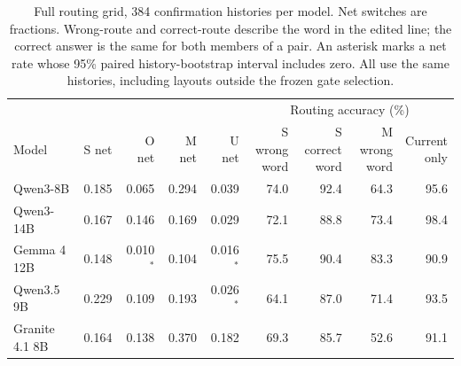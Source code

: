 \begin{table}[t]
\centering
\begin{tabular}{@{}lrrrrrrrr@{}}
\toprule
 & & & & & \multicolumn{4}{c}{Routing accuracy (\%)} \\
\cmidrule(l){6-9}
Model & S net & O net & M net & U net & \shortstack{S wrong\\word} & \shortstack{S correct\\word} & \shortstack{M wrong\\word} & \shortstack{Current\\only} \\
\midrule
Qwen3-8B & 0.185 & 0.065 & 0.294 & 0.039 & 74.0 & 92.4 & 64.3 & 95.6 \\
Qwen3-14B & 0.167 & 0.146 & 0.169 & 0.029 & 72.1 & 88.8 & 73.4 & 98.4 \\
Gemma 4 12B & 0.148 & 0.010$^{*}$ & 0.104 & 0.016$^{*}$ & 75.5 & 90.4 & 83.3 & 90.9 \\
Qwen3.5 9B & 0.229 & 0.109 & 0.193 & 0.026$^{*}$ & 64.1 & 87.0 & 71.4 & 93.5 \\
Granite 4.1 8B & 0.164 & 0.138 & 0.370 & 0.182 & 69.3 & 85.7 & 52.6 & 91.1 \\
\bottomrule
\end{tabular}
\caption{Full routing grid, 384 confirmation histories per model. Net switches are fractions. Wrong-route and correct-route describe the word in the edited line; the correct answer is the same for both members of a pair. An asterisk marks a net rate whose 95\% paired history-bootstrap interval includes zero. All use the same histories, including layouts outside the frozen gate selection.}
\label{tab:full_grid}
\end{table}
